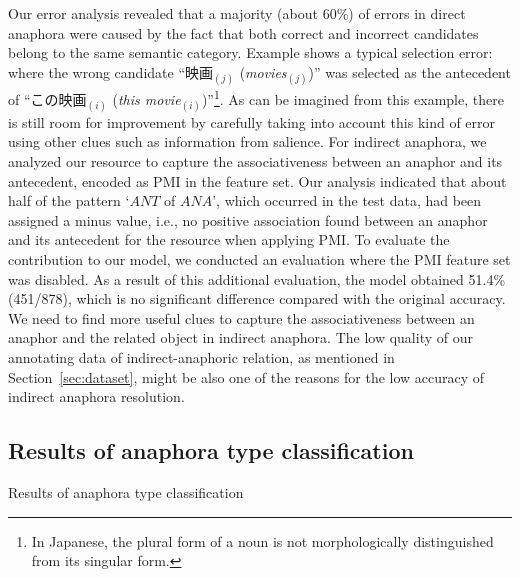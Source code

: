 \documentclass[english]{jnlp_1.4}
\begin{document}
Our error analysis revealed that a majority (about 60\%) of errors in
direct anaphora were caused by the fact that both correct and incorrect
candidates belong to the same semantic category. Example 
shows a typical selection error:
where the wrong candidate ``映画$_{(j)}$ (\emph{movies$_{(j)}$})'' was
selected as the antecedent of ``この映画$_{(i)}$ (\emph{this
  movie$_{(i)}$})''\footnote{In Japanese, the plural form of a noun
  is not morphologically distinguished from its singular form.}.  As
can be imagined from this example, there is still room for
improvement by carefully taking into account this kind of error using
other clues such as information from salience. For indirect anaphora,
we analyzed our resource to capture the associativeness between an
anaphor and its antecedent, encoded as PMI in the feature set. Our
analysis indicated that about half of the pattern `$ANT$ of $ANA$',
which occurred in the test data, had been assigned a minus value, i.e., no
positive association found between an anaphor and its antecedent for
the resource when applying PMI. To evaluate the contribution to our
model, we conducted an evaluation where the PMI feature set was
disabled. As a result of this additional evaluation, the model
obtained 51.4\% (451/878), which is no significant difference compared
with the original accuracy. We need to find more useful clues to
capture the associativeness between an anaphor and the related object
in indirect anaphora. The low quality of our annotating data of
indirect-anaphoric relation, as mentioned in
Section~\ref{sec:dataset}, might be also one of the reasons for the
low accuracy of indirect anaphora resolution.


\subsection{Results of anaphora type classification}

\begin{table}[b]
\caption{Results of anaphora type classification}
  \label{tb:result_tc}

\end{table}
\end{document}
